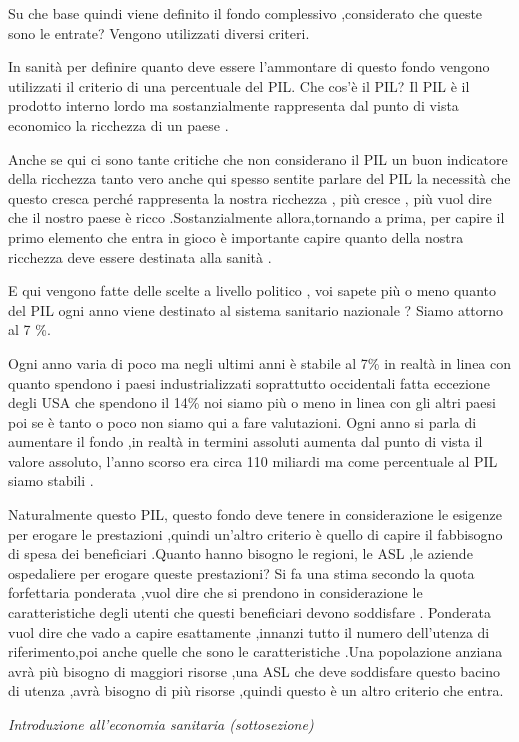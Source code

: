 \documentclass[]{article}
\begin{document}
Su che base quindi viene definito il fondo complessivo ,considerato che
queste sono le entrate? Vengono utilizzati diversi criteri.

In sanità per definire quanto deve essere l'ammontare di questo fondo
vengono utilizzati il criterio di una percentuale del PIL. Che cos'è il
PIL? Il PIL è il prodotto interno lordo ma sostanzialmente rappresenta
dal punto di vista economico la ricchezza di un paese .

Anche se qui ci sono tante critiche che non considerano il PIL un buon
indicatore della ricchezza tanto vero anche qui spesso sentite parlare
del PIL la necessità che questo cresca perché rappresenta la nostra
ricchezza , più cresce , più vuol dire che il nostro paese è ricco
.Sostanzialmente allora,tornando a prima, per capire il primo elemento
che entra in gioco è importante capire quanto della nostra ricchezza
deve essere destinata alla sanità .

E qui vengono fatte delle scelte a livello politico , voi sapete più o
meno quanto del PIL ogni anno viene destinato al sistema sanitario
nazionale ? Siamo attorno al 7 \%.

Ogni anno varia di poco ma negli ultimi anni è stabile al 7\% in realtà
in linea con quanto spendono i paesi industrializzati soprattutto
occidentali fatta eccezione degli USA che spendono il 14\% noi siamo più
o meno in linea con gli altri paesi poi se è tanto o poco non siamo qui
a fare valutazioni. Ogni anno si parla di aumentare il fondo ,in realtà
in termini assoluti aumenta dal punto di vista il valore assoluto,
l'anno scorso era circa 110 miliardi ma come percentuale al PIL siamo
stabili .

Naturalmente questo PIL, questo fondo deve tenere in considerazione le
esigenze per erogare le prestazioni ,quindi un'altro criterio è quello
di capire il fabbisogno di spesa dei beneficiari .Quanto hanno bisogno
le regioni, le ASL ,le aziende ospedaliere per erogare queste
prestazioni? Si fa una stima secondo la quota forfettaria ponderata
,vuol dire che si prendono in considerazione le caratteristiche degli
utenti che questi beneficiari devono soddisfare . Ponderata vuol dire
che vado a capire esattamente ,innanzi tutto il numero dell'utenza di
riferimento,poi anche quelle che sono le caratteristiche .Una
popolazione anziana avrà più bisogno di maggiori risorse ,una ASL che
deve soddisfare questo bacino di utenza ,avrà bisogno di più risorse
,quindi questo è un altro criterio che entra.

\emph{Introduzione all'economia sanitaria (sottosezione)}
\end{document}
